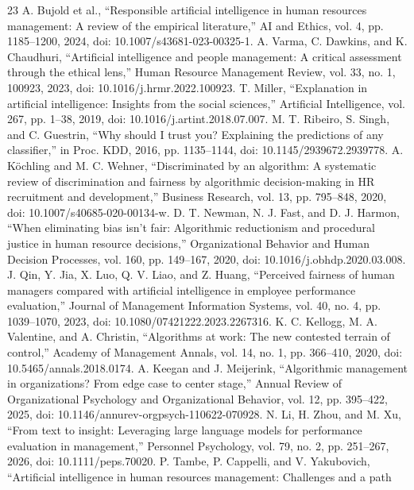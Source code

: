 \documentclass[
  10pt,
  runningheads]{llncs}
\begin{document}
\begin{thebibliography}{23}
 A. Bujold et al., ``Responsible artificial intelligence in human
resources management: A review of the empirical literature,'' AI and
Ethics, vol. 4, pp. 1185--1200, 2024, doi: 10.1007/s43681-023-00325-1.
 A. Varma, C. Dawkins, and K. Chaudhuri, ``Artificial
intelligence and people management: A critical assessment through the
ethical lens,'' Human Resource Management Review, vol. 33, no. 1,
100923, 2023, doi: 10.1016/j.hrmr.2022.100923.
 T. Miller, ``Explanation in artificial intelligence: Insights
from the social sciences,'' Artificial Intelligence, vol. 267, pp.
1--38, 2019, doi: 10.1016/j.artint.2018.07.007.
 M. T. Ribeiro, S. Singh, and C. Guestrin, ``Why should I trust
you? Explaining the predictions of any classifier,'' in Proc. KDD, 2016,
pp. 1135--1144, doi: 10.1145/2939672.2939778.
 A. Köchling and M. C. Wehner, ``Discriminated by an algorithm: A
systematic review of discrimination and fairness by algorithmic
decision-making in HR recruitment and development,'' Business Research,
vol. 13, pp. 795--848, 2020, doi: 10.1007/s40685-020-00134-w.
 D. T. Newman, N. J. Fast, and D. J. Harmon, ``When eliminating
bias isn't fair: Algorithmic reductionism and procedural justice in
human resource decisions,'' Organizational Behavior and Human Decision
Processes, vol. 160, pp. 149--167, 2020, doi:
10.1016/j.obhdp.2020.03.008.
 J. Qin, Y. Jia, X. Luo, Q. V. Liao, and Z. Huang, ``Perceived
fairness of human managers compared with artificial intelligence in
employee performance evaluation,'' Journal of Management Information
Systems, vol. 40, no. 4, pp. 1039--1070, 2023, doi:
10.1080/07421222.2023.2267316.
 K. C. Kellogg, M. A. Valentine, and A. Christin, ``Algorithms at
work: The new contested terrain of control,'' Academy of Management
Annals, vol. 14, no. 1, pp. 366--410, 2020, doi:
10.5465/annals.2018.0174.
 A. Keegan and J. Meijerink, ``Algorithmic management in
organizations? From edge case to center stage,'' Annual Review of
Organizational Psychology and Organizational Behavior, vol. 12, pp.
395--422, 2025, doi: 10.1146/annurev-orgpsych-110622-070928.
 N. Li, H. Zhou, and M. Xu, ``From text to insight: Leveraging
large language models for performance evaluation in management,''
Personnel Psychology, vol. 79, no. 2, pp. 251--267, 2026, doi:
10.1111/peps.70020.
 P. Tambe, P. Cappelli, and V. Yakubovich, ``Artificial
intelligence in human resources management: Challenges and a path

\end{thebibliography}
\end{document}
